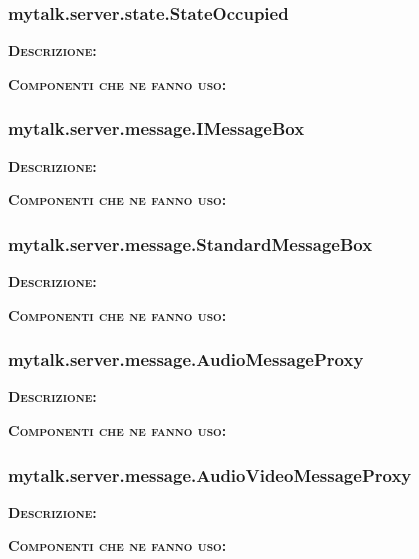 \subsubsection{mytalk.server.state.StateOccupied}
\begin{description}
	\item{\scshape\bfseries Descrizione:} 
	\item{\scshape\bfseries Componenti che ne fanno uso:} 
\end{description}

\subsubsection{mytalk.server.message.IMessageBox}
\begin{description}
	\item{\scshape\bfseries Descrizione:} 
	\item{\scshape\bfseries Componenti che ne fanno uso:} 
\end{description}

\subsubsection{mytalk.server.message.StandardMessageBox}
\begin{description}
	\item{\scshape\bfseries Descrizione:} 
	\item{\scshape\bfseries Componenti che ne fanno uso:} 
\end{description}

\subsubsection{mytalk.server.message.AudioMessageProxy}
\begin{description}
	\item{\scshape\bfseries Descrizione:} 
	\item{\scshape\bfseries Componenti che ne fanno uso:} 
\end{description}

\subsubsection{mytalk.server.message.AudioVideoMessageProxy}
\begin{description}
	\item{\scshape\bfseries Descrizione:} 
	\item{\scshape\bfseries Componenti che ne fanno uso:} 
\end{description}

